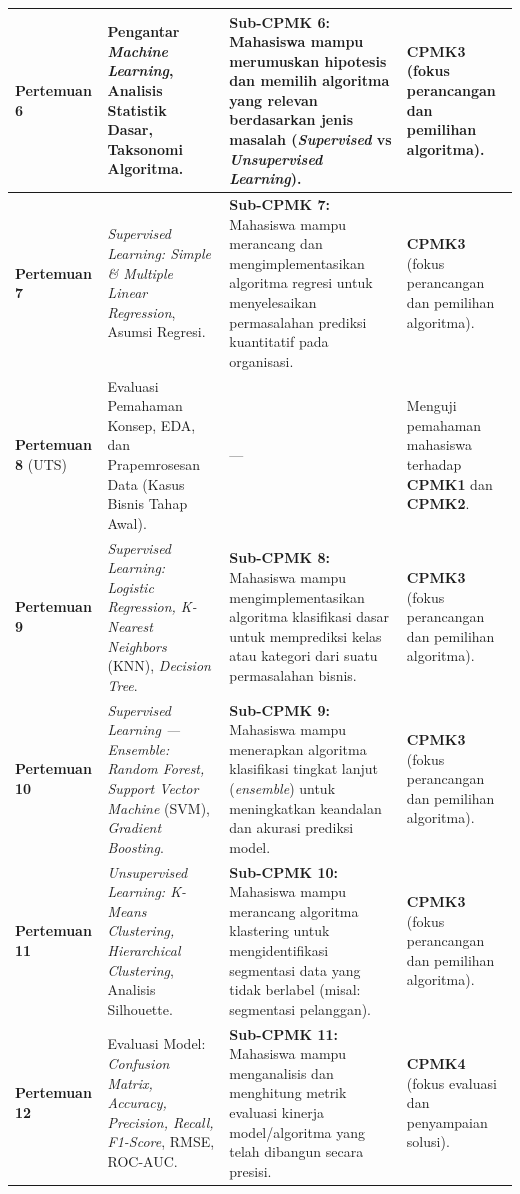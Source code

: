 \documentclass[12pt,a4paper]{article}
\begin{document}
{\begin{longtable}{|>{\raggedright\arraybackslash}p{2.05cm}|>{\raggedright\arraybackslash}p{4.55cm}|>{\raggedright\arraybackslash}p{4.55cm}|>{\raggedright\arraybackslash}p{2.95cm}|}
\textbf{Pertemuan 6} &
Pengantar \textit{Machine Learning}, Analisis Statistik Dasar, Taksonomi Algoritma. &
\textbf{Sub-CPMK 6:} Mahasiswa mampu merumuskan hipotesis dan memilih algoritma yang relevan berdasarkan jenis masalah (\textit{Supervised} vs \textit{Unsupervised Learning}). &
\textbf{CPMK3} (fokus perancangan dan pemilihan algoritma). \\
\hline

\textbf{Pertemuan 7} &
\textit{Supervised Learning: Simple \& Multiple Linear Regression}, Asumsi Regresi. &
\textbf{Sub-CPMK 7:} Mahasiswa mampu merancang dan mengimplementasikan algoritma regresi untuk menyelesaikan permasalahan prediksi kuantitatif pada organisasi. &
\textbf{CPMK3} (fokus perancangan dan pemilihan algoritma). \\
\hline

\textbf{Pertemuan 8} (UTS) &
Evaluasi Pemahaman Konsep, EDA, dan Prapemrosesan Data (Kasus Bisnis Tahap Awal). &
--- &
Menguji pemahaman mahasiswa terhadap \textbf{CPMK1} dan \textbf{CPMK2}. \\
\hline

\textbf{Pertemuan 9} &
\textit{Supervised Learning: Logistic Regression, K-Nearest Neighbors} (KNN), \textit{Decision Tree}. &
\textbf{Sub-CPMK 8:} Mahasiswa mampu mengimplementasikan algoritma klasifikasi dasar untuk memprediksi kelas atau kategori dari suatu permasalahan bisnis. &
\textbf{CPMK3} (fokus perancangan dan pemilihan algoritma). \\
\hline

\textbf{Pertemuan 10} &
\textit{Supervised Learning --- Ensemble: Random Forest, Support Vector Machine} (SVM), \textit{Gradient Boosting}. &
\textbf{Sub-CPMK 9:} Mahasiswa mampu menerapkan algoritma klasifikasi tingkat lanjut (\textit{ensemble}) untuk meningkatkan keandalan dan akurasi prediksi model. &
\textbf{CPMK3} (fokus perancangan dan pemilihan algoritma). \\
\hline

\textbf{Pertemuan 11} &
\textit{Unsupervised Learning: K-Means Clustering, Hierarchical Clustering}, Analisis Silhouette. &
\textbf{Sub-CPMK 10:} Mahasiswa mampu merancang algoritma klastering untuk mengidentifikasi segmentasi data yang tidak berlabel (misal: segmentasi pelanggan). &
\textbf{CPMK3} (fokus perancangan dan pemilihan algoritma). \\
\hline

\textbf{Pertemuan 12} &
Evaluasi Model: \textit{Confusion Matrix, Accuracy, Precision, Recall, F1-Score}, RMSE, ROC-AUC. &
\textbf{Sub-CPMK 11:} Mahasiswa mampu menganalisis dan menghitung metrik evaluasi kinerja model/algoritma yang telah dibangun secara presisi. &
\textbf{CPMK4} (fokus evaluasi dan penyampaian solusi). \\
\hline


\end{longtable}}
\end{document}
